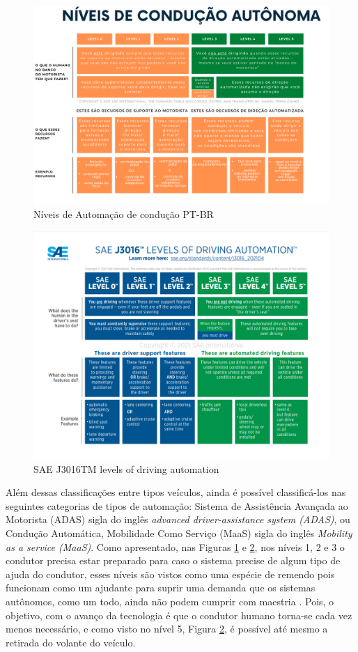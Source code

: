\begin{figure}[H]
\centering
\includegraphics[width=15cm]{Figures/IC-Graph1.png}
\caption{Níveis de Automação de condução PT-BR}
\label{Graph_PT}
\end{figure}
\begin{figure}[H]
\centering
\includegraphics[width=15cm]{Figures/IC-GrapEN.png}
\caption{SAE J3016TM levels of driving automation \cite{SAE}}
\label{Graph_EN}
\end{figure}

Além dessas classificações entre tipos veículos, ainda é possível classificá-los nas seguintes categorias de tipos de automação: Sistema de Assistência Avançada ao Motorista (ADAS) sigla do inglês \textit{advanced driver-assistance system (ADAS)}, ou Condução Automática, Mobilidade Como Serviço (MaaS) sigla do inglês \textit{Mobility as a service (MaaS)}.
Como apresentado, nas Figuras \ref{Graph_PT} e \ref{Graph_EN}, nos níveis 1, 2 e 3 o condutor precisa estar preparado para caso o sistema precise de algum tipo de ajuda do condutor, esses níveis são vistos como uma espécie de remendo pois funcionam como um ajudante para suprir uma demanda que os sistemas autônomos, como um todo, ainda não podem cumprir com maestria \cite{4cenarios_ocidental}. Pois, o objetivo, com o avanço da tecnologia é que o condutor humano torna-se cada vez menos necessário, e como visto no nível 5, Figura \ref{Graph_EN}, é possível até mesmo a retirada do volante do veículo. 

